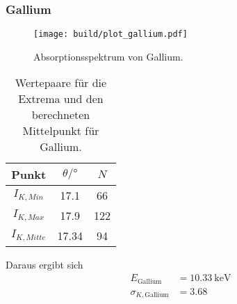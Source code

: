 \subsubsection*{Gallium}
\begin{figure}[H]
    \centering
    \texttt{[image: build/plot\_gallium.pdf]}
    \caption{Absorptionsspektrum von Gallium.}
    \label{fig:gallium}
\end{figure}
\begin{table}[H]                                                                                   
    \centering                                                                                     
        \caption{Wertepaare für die Extrema und den berechneten Mittelpunkt für Gallium.}                      
        \label{tab:Ga}                                                                        
        \begin{tabular}{S S[table-format=2.2] S}                                                   
          \toprule                                                                                 
          {Punkt} & {$\theta /\si{\degree}$} & {$N$}\\                                            
          \midrule                                                                                 
          {$I_{K,Min  }$} &17.1&66\\
          {$I_{K,Max  }$} &17.9&122\\
          {$I_{K,Mitte}$} &17.34&94\\
          \bottomrule                                                                              
        \end{tabular}                                                                              
      \end{table}                                                                                  
Daraus ergibt sich                                                                                 
\begin{align*}                                                                                     
    E_\text{Gallium} &= \SI{10.33}{\kilo\electronvolt}\\                  
    \sigma_{K, \text{Gallium}} &= \num{3.68}                      
\end{align*}                                                                                       

